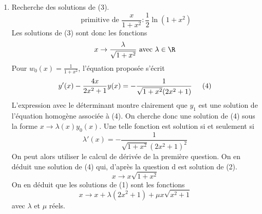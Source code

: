 \begin{enumerate}
 \item Recherche des solutions de (3). 
\begin{displaymath}
 \text{ primitive de }\frac{x}{1+x^2} : \frac{1}{2}\ln(1+x^2)
\end{displaymath}
Les solutions de (3) sont donc les fonctions 
\begin{displaymath}
 x \rightarrow \frac{\lambda}{\sqrt{1+x^2}}\text{ avec } \lambda \in \R
\end{displaymath}
Pour $w_0(x) = \frac{1}{1+x^2}$, l'équation proposée s'écrit
\begin{displaymath}
 y'(x) - \frac{4x}{2x^2+1}y(x) = -\frac{1}{\sqrt{1+x^2}(2x^2+1)}  \hspace{0.5cm} (4)
\end{displaymath}
L'expression avec le déterminant montre clairement que $y_1$ est une solution de l'équation homogène associée à (4). On cherche donc une solution de (4) sous la forme $x\rightarrow \lambda(x) y_0(x)$. Une telle fonction est solution si et seulement si
\begin{displaymath}
 \lambda'(x) = -\frac{1}{\sqrt{1+x^2}(2x^2+1)^2}
\end{displaymath}
On peut alors utiliser le calcul de dérivée de la première question. On en déduit une solution de (4) qui, d'après la question d est solution de (2). 
\begin{displaymath}
 x\rightarrow x\sqrt{1+x^2}
\end{displaymath}
On en déduit que les solutions de (1) sont les fonctions
\begin{displaymath}
 x\rightarrow x + \lambda(2x^2+1) + \mu x\sqrt{x^2+1}
\end{displaymath}
avec $\lambda$ et $\mu$ réels.
\end{enumerate}
 
